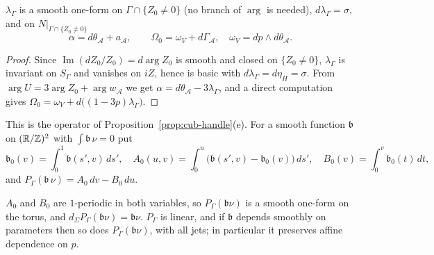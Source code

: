 \begin{lemma}\label{lem:fer-frame}
$\lambda_\Gamma$ is a smooth one-form on $\Gamma\cap\{Z_0\ne0\}$ (no branch of $\arg$ is needed), $d\lambda_\Gamma=\sigma$, and on
$N|_{\Gamma\cap\{Z_0\ne0\}}$
\[
 \alpha=d\theta_{\mathcal A}+a_{\mathcal A},\qquad \Omega_0=\omega_V+d\Gamma_{\mathcal A},\quad \omega_V=dp\wedge d\theta_{\mathcal A}.
\]
\end{lemma}

\begin{proof}
Since $\operatorname{Im}(dZ_0/Z_0)=d\arg Z_0$ is smooth and closed on $\{Z_0\ne0\}$, $\lambda_\Gamma$ is invariant on $S_\Gamma$ and vanishes on $iZ$, hence is basic with $d\lambda_\Gamma=d\eta_H=\sigma$. From $\arg U=3\arg Z_0+\arg w_{\mathcal A}$ we get $\alpha=d\theta_{\mathcal A}-3\lambda_\Gamma$, and a direct computation gives $\Omega_0=\omega_V+d\big((1-3p)\lambda_\Gamma\big)$.
\end{proof}

\begin{definition}\label{def:fer-Pprim}
This is the operator of Proposition~\ref{prop:cub-handle}(e). For a smooth function $\mathfrak b$ on $(\mathbb{R}/\mathbb{Z})^2$ with
$\int\mathfrak b\,\nu=0$ put
\[
 \mathfrak b_0(v)=\int_0^1\mathfrak b(s',v)\,ds',\quad
 A_0(u,v)=\int_0^u\big(\mathfrak b(s',v)-\mathfrak b_0(v)\big)\,ds',\quad
 B_0(v)=\int_0^v\mathfrak b_0(t)\,dt,
\]
and $P_\Gamma(\mathfrak b\,\nu)=A_0\,dv-B_0\,du$.
\end{definition}

\begin{lemma}\label{lem:fer-Pprim}
$A_0$ and $B_0$ are $1$-periodic in both variables, so $P_\Gamma(\mathfrak b\nu)$ is a smooth one-form on the torus, and
$d_\Sigma P_\Gamma(\mathfrak b\nu)=\mathfrak b\nu$. $P_\Gamma$ is linear, and if $\mathfrak b$ depends smoothly on parameters then so does
$P_\Gamma(\mathfrak b\nu)$, with all jets; in particular it preserves affine dependence on $p$.
\end{lemma}

